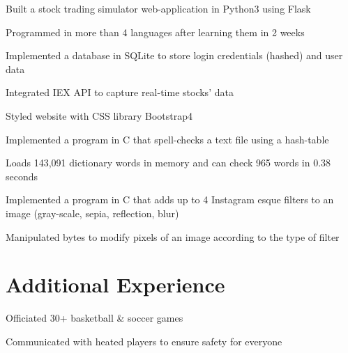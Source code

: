 \documentclass[]{deedy-resume-openfont}
\begin{document}
\begin{minipage}[t]{0.66\textwidth}
    \begin{tightemize}
        \item Built a stock trading simulator web-application in Python3 using Flask
        \item Programmed in more than 4 languages after learning them in 2 weeks
        \item Implemented a database in SQLite to store login credentials (hashed) and user data
        \item Integrated IEX API to capture real-time stocks' data
        \item Styled website with CSS library Bootstrap4
    \end{tightemize}
    \sectionsep

    \begin{tightemize}
        \item Implemented a program in C that spell-checks a text file using a hash-table
        \item Loads 143,091 dictionary words in memory and can check 965 words in 0.38 seconds
    \end{tightemize}
    \sectionsep

    \begin{tightemize}
        \item Implemented a program in C that adds up to 4 Instagram esque filters to an image (gray-scale, sepia, reflection, blur)
        \item Manipulated bytes to modify pixels of an image according to the type of filter
    \end{tightemize}
    \sectionsep

    \section {Additional Experience}
    \begin{tightemize}
        \item Officiated 30+ basketball \& soccer games
        \item Communicated with heated players to ensure safety for everyone
    \end{tightemize}




\end{minipage}
\end{document}
